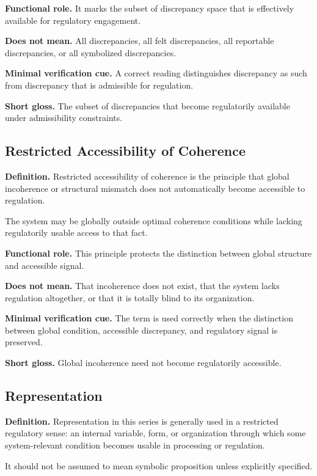 \documentclass[11pt,a4paper]{article}
\begin{document}
	\textbf{Functional role.} It marks the subset of discrepancy space that is effectively available for regulatory engagement.
	
	\textbf{Does not mean.} All discrepancies, all felt discrepancies, all reportable discrepancies, or all symbolized discrepancies.
	
	\textbf{Minimal verification cue.} A correct reading distinguishes discrepancy as such from discrepancy that is admissible for regulation.
	
	\textbf{Short gloss.} The subset of discrepancies that become regulatorily available under admissibility constraints.
	
	\subsection{Restricted Accessibility of Coherence}
	
	\textbf{Definition.} Restricted accessibility of coherence is the principle that global incoherence or structural mismatch does not automatically become accessible to regulation.
	
	The system may be globally outside optimal coherence conditions while lacking regulatorily usable access to that fact.
	
	\textbf{Functional role.} This principle protects the distinction between global structure and accessible signal.
	
	\textbf{Does not mean.} That incoherence does not exist, that the system lacks regulation altogether, or that it is totally blind to its organization.
	
	\textbf{Minimal verification cue.} The term is used correctly when the distinction between global condition, accessible discrepancy, and regulatory signal is preserved.
	
	\textbf{Short gloss.} Global incoherence need not become regulatorily accessible.
	
	\subsection{Representation}
	
	\textbf{Definition.} Representation in this series is generally used in a restricted regulatory sense: an internal variable, form, or organization through which some system-relevant condition becomes usable in processing or regulation.
	
	It should not be assumed to mean symbolic proposition unless explicitly specified.
	
\end{document}
